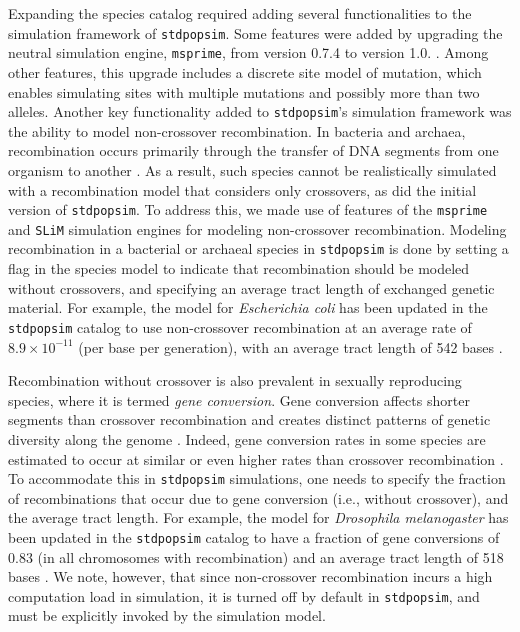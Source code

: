 \documentclass[hidelinks]{article}
\newcommand{\stdpopsim}{\texttt{stdpopsim}\xspace}
\begin{document}
Expanding the species catalog required adding several functionalities to the simulation framework of \stdpopsim.
Some features were added by upgrading the neutral simulation engine, \texttt{msprime}, from version 0.7.4 to version 1.0. \citep{Baumdicker2022}.
Among other features, this upgrade includes a discrete site model of mutation,
which enables simulating sites with multiple mutations and possibly more than two alleles.
Another key functionality added to \stdpopsim's simulation framework was the ability to model non-crossover recombination.
In bacteria and archaea, recombination occurs primarily through the transfer of DNA segments from one organism to another \citep{Thomas2005,Didelot2010,Gophna2022}.
As a result, such species cannot be realistically simulated with a recombination model that considers only crossovers,
as did the initial version of \stdpopsim.
To address this, we made use of features of the \texttt{msprime} and \texttt{SLiM} simulation engines for modeling non-crossover recombination.
Modeling recombination in a bacterial or archaeal species in \stdpopsim is done by setting a flag in the species model to indicate that recombination should be modeled without crossovers,
and specifying an average tract length of exchanged genetic material.
For example, the model for \textit{Escherichia coli} has been updated in the \stdpopsim catalog to use non-crossover recombination at an average rate of $8.9\times 10^{-11}$ (per base per generation),
with an average tract length of 542 bases \citep{Wielgoss2011,Didelot2012}.

Recombination without crossover is also prevalent in sexually reproducing species,
where it is termed \emph{gene conversion}.
Gene conversion affects shorter segments than crossover recombination and creates distinct patterns of genetic diversity along the genome \citep{Korunes2017}.
Indeed, gene conversion rates in some species are estimated to occur at similar or even higher rates than crossover recombination \citep{Gay2007,Comeron2012,Wijnker2013}.
To accommodate this in \stdpopsim simulations,
one needs to specify the fraction of recombinations that occur due to gene conversion (i.e., without crossover), and the average tract length.
For example, the model for \emph{Drosophila melanogaster} has been updated in the \stdpopsim catalog to have a fraction of gene conversions of 0.83 (in all chromosomes with recombination) and an average tract length of 518 bases \citep{Comeron2012}.
We note, however, that since non-crossover recombination incurs a high computation load in simulation,
it is turned off by default in \stdpopsim, and must be explicitly invoked by the simulation model.
\end{document}
